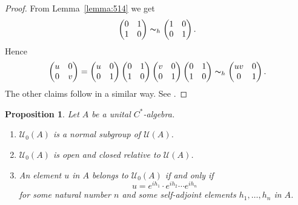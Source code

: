 \documentclass{book}
\newtheorem{proposition}[definition]{Proposition}
\def\cstar{\(C^*\)-algebra}
\begin{document}
\begin{proof}
  From Lemma~\ref{lemma:514} we get
  \[
  \begin{pmatrix}
    0&1\\1&0
  \end{pmatrix}
  \thicksim_h
  \begin{pmatrix}
    1&0\\0&1
  \end{pmatrix}.
  \]
  Hence
  \[
  \begin{pmatrix}
    u&0\\0&v
  \end{pmatrix}
  =
  \begin{pmatrix}
    u&0\\0&1
  \end{pmatrix}
  \begin{pmatrix}
    0&1\\1&0
  \end{pmatrix}
  \begin{pmatrix}
    v&0\\0&1
  \end{pmatrix}
  \begin{pmatrix}
    0&1\\1&0
  \end{pmatrix}
  \thicksim_h
  \begin{pmatrix}
    uv&0\\0&1
  \end{pmatrix}.
  \]
  The other claims follow in a similar way. See \cite[Lemma~2.1.5]{RordamLarsenLaustsen2000}.
\end{proof}
\begin{proposition}\label{prop:517}
  Let \(A\) be a unital \cstar.
  \begin{enumerate}
    \item\label{prop:5171} \(\mathcal{U}_0(A)\) is a normal subgroup of \(\mathcal{U}(A)\).
    \item\label{prop:5172} \(\mathcal{U}_0(A)\) is open and closed relative to \(\mathcal{U}(A)\).
    \item\label{prop:5173} An element \(u\) in \(A\) belongs to \(\mathcal{U}_0(A)\) if and only if
      \[u=e^{ih_1}\cdot e^{ih_2}\cdots e^{ih_n}\]
      for some natural number \(n\) and some self-adjoint elements \(h_1,\ldots,h_n\) in \(A\).
  \end{enumerate}
\end{proposition}
\end{document}
